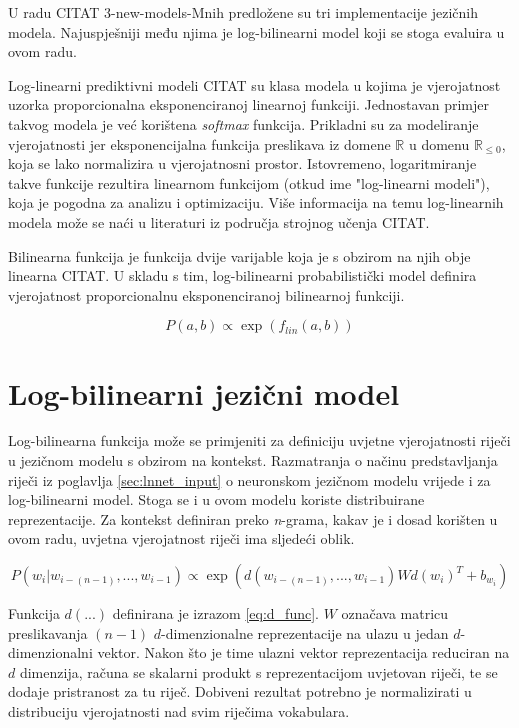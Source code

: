 \documentclass[times, utf8, diplomski, numeric]{fer}
\begin{document}
U radu CITAT 3-new-models-Mnih predložene su tri implementacije jezičnih modela. Najuspješniji među njima je log-bilinearni model koji se stoga evaluira u ovom radu.

Log-linearni prediktivni modeli CITAT su klasa modela u kojima je vjerojatnost uzorka proporcionalna eksponenciranoj linearnoj funkciji. Jednostavan primjer takvog modela je već korištena \textit{softmax} funkcija. Prikladni su za modeliranje vjerojatnosti jer eksponencijalna funkcija preslikava iz domene $\mathbb{R}$ u domenu $\mathbb{R}_{\leq 0}$, koja se lako normalizira u vjerojatnosni prostor. Istovremeno, logaritmiranje takve funkcije rezultira linearnom funkcijom (otkud ime "log-linearni modeli"), koja je pogodna za analizu i optimizaciju. Više informacija na temu log-linearnih modela može se naći u literaturi iz područja strojnog učenja CITAT.

Bilinearna funkcija je funkcija dvije varijable koja je s obzirom na njih obje linearna CITAT. U skladu s tim, log-bilinearni probabilistički model definira vjerojatnost proporcionalnu eksponenciranoj bilinearnoj funkciji.

\[
P(a, b) \propto \exp(f_{lin}(a, b))
\]

\section{Log-bilinearni jezični model}

Log-bilinearna funkcija može se primjeniti za definiciju uvjetne vjerojatnosti riječi u jezičnom modelu s obzirom na kontekst. Razmatranja o načinu predstavljanja riječi iz poglavlja \ref{sec:lnnet_input} o neuronskom jezičnom modelu vrijede i za log-bilinearni model. Stoga se i u ovom modelu koriste distribuirane reprezentacije. Za kontekst definiran preko \textit{n}-grama, kakav je i dosad korišten u ovom radu, uvjetna vjerojatnost riječi ima sljedeći oblik.

\begin{equation}
P(w_i | w_{i - (n - 1)}, ... , w_{i - 1}) 
  \propto \exp(d(w_{i - (n - 1)}, ... , w_{i - 1}) W d(w_i)^T + b_{w_i})
\end{equation}

Funkcija $d(...)$ definirana je izrazom \ref{eq:d_func}. $W$ označava matricu preslikavanja $(n - 1)$ $d$-dimenzionalne reprezentacije na ulazu u jedan $d$-dimenzionalni vektor. Nakon što je time ulazni vektor reprezentacija reduciran na $d$ dimenzija, računa se skalarni produkt s reprezentacijom uvjetovan riječi, te se dodaje pristranost za tu riječ. Dobiveni rezultat potrebno je normalizirati u distribuciju vjerojatnosti nad svim riječima vokabulara.
\end{document}
